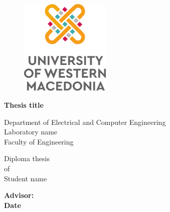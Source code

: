 \begin{titlepage}


\begin{figure}[h!]
  \begin{center}
  \vspace{-1cm}
    \includegraphics[width=4.3cm]{logos/en/uowm-logo-vertical-en.png}
    \label{fig:cover_uowm_logo}
  \end{center}
\end{figure}

\vspace{\fill}

\Large \centering \textbf{Thesis title}

\vspace{\fill}

\begin{center}
    \normalsize Department of Electrical and Computer Engineering \\
    \normalsize Laboratory name \\
    \normalsize Faculty of Engineering
\end{center}

\vspace{\fill}

\begin{center}
    \normalsize Diploma thesis \\
    \normalsize of\\
    \normalsize Student name
\end{center}

\vspace{\fill}

\begin{center}
    \normalsize \textbf{Advisor:} \\
    \normalsize \textbf{Date}
\end{center}

\end{titlepage}
